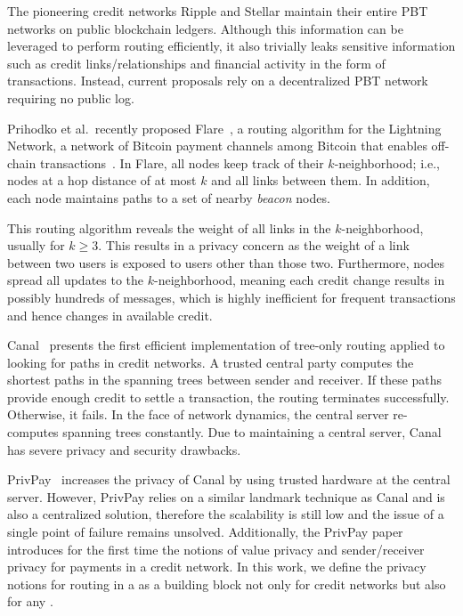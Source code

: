 The pioneering credit networks Ripple and Stellar maintain their entire PBT networks on public blockchain ledgers. 
Although this information can be leveraged to 
perform routing efficiently, it also trivially leaks sensitive information such as %
credit links/relationships and financial activity in the form of transactions.  Instead, current proposals rely  
on a decentralized PBT network requiring no public log.

Prihodko et al.\ recently proposed Flare~\cite{prihodko2016flare}, a routing algorithm for the 
 Lightning Network, 
a network of Bitcoin payment channels among Bitcoin \users that enables off-chain transactions~\cite{poon2015bitcoin}.
In Flare, all nodes keep track of their $k$-neighborhood; i.e., nodes at a hop distance of at most $k$ and all links between them. In addition, each node maintains paths to a set of nearby \emph{beacon} nodes.

This routing algorithm reveals the weight of all links in the $k$-neighborhood, usually for $k\geq 3$. 
This results in
a privacy concern as the weight of a link between two users is exposed to users other than those two.
Furthermore, nodes spread all updates to the $k$-neighborhood, meaning each credit change results in possibly hundreds of messages, which is highly inefficient for frequent transactions and hence changes in available credit. 

Canal~\cite{viswanath2012canal} presents the first efficient implementation of tree-only routing applied to 
looking for paths in credit networks. A trusted central party computes the shortest paths in the spanning trees between sender and receiver. If these paths provide enough credit to settle a transaction, the routing terminates successfully. Otherwise, it fails. 
In the face of network dynamics, the central server re-computes spanning trees constantly. 
Due to maintaining a central server, Canal~\cite{viswanath2012canal} has severe privacy and security drawbacks. 

PrivPay~\cite{moreno15privpay} increases the privacy of Canal by using trusted hardware at the central server. However, PrivPay relies on a 
similar landmark technique as Canal and is also a centralized solution, therefore the scalability is still low and the issue of a single point of failure remains unsolved. 
Additionally, the PrivPay paper introduces for the first time the notions of 
value privacy and sender/receiver privacy for payments in a credit network.
In this work, we define the privacy notions for routing in a \paysys as a building 
block not only for credit networks but also for any \paysys. 

